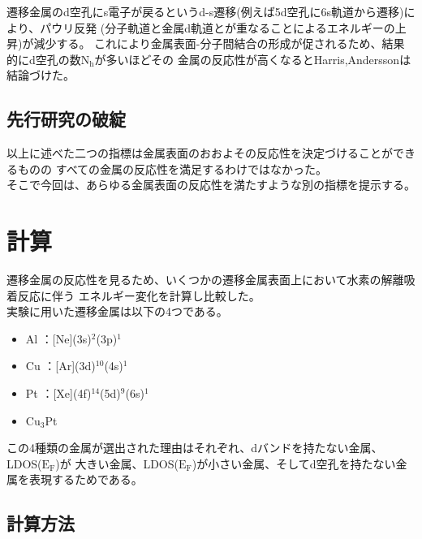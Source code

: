 \documentclass[12pt]{ltjsarticle}
\begin{document}
遷移金属のd空孔にs電子が戻るというd-s遷移(例えば5d空孔に6s軌道から遷移)により、パウリ反発
(分子軌道と金属d軌道とが重なることによるエネルギーの上昇)が減少する。\cite{MORIKAWA2006}
これにより金属表面-分子間結合の形成が促されるため、結果的にd空孔の数$\text{N}_\text{h}$が多いほどその
金属の反応性が高くなるとHarris,Anderssonは結論づけた。\cite{J.Harris1985}

\subsection{先行研究の破綻}
以上に述べた二つの指標は金属表面のおおよその反応性を決定づけることができるものの
すべての金属の反応性を満足するわけではなかった。\\
そこで今回は、あらゆる金属表面の反応性を満たすような別の指標を提示する。\cite{Science1995}

\section{計算}
遷移金属の反応性を見るため、いくつかの遷移金属表面上において水素の解離吸着反応に伴う
エネルギー変化を計算し比較した。\\

実験に用いた遷移金属は以下の4つである。

\begin{itemize}
 \item Al ：[Ne](3s)$^\text{2}$(3p)$^\text{1}$
 \item Cu ：[Ar](3d)$^\text{10}$(4s)$^\text{1}$
 \item Pt ：[Xe](4f)$^\text{14}$(5d)$^\text{9}$(6s)$^\text{1}$
 \item $\text{Cu}_\text{3}$Pt
\end{itemize}
この4種類の金属が選出された理由はそれぞれ、dバンドを持たない金属、LDOS($\text{E}_\text{F}$)が
大きい金属、LDOS($\text{E}_\text{F}$)が小さい金属、そしてd空孔を持たない金属を表現するためである。

\subsection{計算方法}
\end{document}
